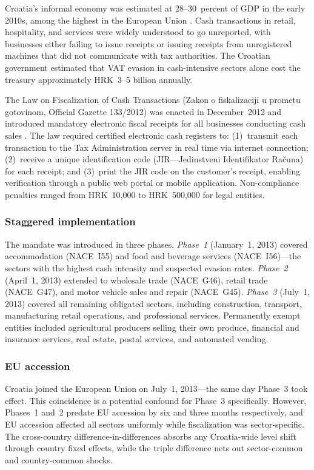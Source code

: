 \documentclass[12pt]{article}
\begin{document}
Croatia's informal economy was estimated at 28--30~percent of GDP in the early 2010s, among the highest in the European Union \citep{europeancommission2020}. Cash transactions in retail, hospitality, and services were widely understood to go unreported, with businesses either failing to issue receipts or issuing receipts from unregistered machines that did not communicate with tax authorities. The Croatian government estimated that VAT evasion in cash-intensive sectors alone cost the treasury approximately HRK~3--5 billion annually.

The Law on Fiscalization of Cash Transactions (Zakon o fiskalizaciji u prometu gotovinom, Official Gazette 133/2012) was enacted in December~2012 and introduced mandatory electronic fiscal receipts for all businesses conducting cash sales \citep{croatia2012}. The law required certified electronic cash registers to: (1)~transmit each transaction to the Tax Administration server in real time via internet connection; (2)~receive a unique identification code (JIR---Jedinstveni Identifikator Ra\v{c}una) for each receipt; and (3)~print the JIR code on the customer's receipt, enabling verification through a public web portal or mobile application. Non-compliance penalties ranged from HRK~10,000 to HRK~500,000 for legal entities.

\subsubsection*{Staggered implementation}  The mandate was introduced in three phases. \emph{Phase~1} (January~1, 2013) covered accommodation (NACE~I55) and food and beverage services (NACE~I56)---the sectors with the highest cash intensity and suspected evasion rates. \emph{Phase~2} (April~1, 2013) extended to wholesale trade (NACE~G46), retail trade (NACE~G47), and motor vehicle sales and repair (NACE~G45). \emph{Phase~3} (July~1, 2013) covered all remaining obligated sectors, including construction, transport, manufacturing retail operations, and professional services. Permanently exempt entities included agricultural producers selling their own produce, financial and insurance services, real estate, postal services, and automated vending.

\subsubsection*{EU accession}  Croatia joined the European Union on July~1, 2013---the same day Phase~3 took effect. This coincidence is a potential confound for Phase~3 specifically. However, Phases~1 and~2 predate EU accession by six and three months respectively, and EU accession affected all sectors uniformly while fiscalization was sector-specific. The cross-country difference-in-differences absorbs any Croatia-wide level shift through country fixed effects, while the triple difference nets out sector-common and country-common shocks.
\end{document}
